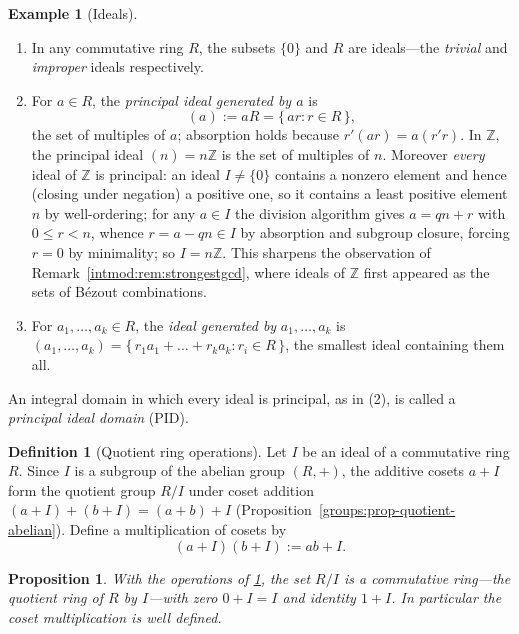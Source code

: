 \documentclass[11pt,a4paper]{article}
\newtheorem{proposition}[theorem]{Proposition}
\theoremstyle{definition}
\newtheorem{definition}[theorem]{Definition}
\newtheorem{example}[theorem]{Example}
\theoremstyle{remark}
\newcommand{\Z}{\ensuremath{\mathbb{Z}}}
\begin{document}
\begin{example}[Ideals]\label{ringsfields:exa-ideal}
\begin{enumerate}
\item In any commutative ring \(R\), the subsets \(\{0\}\) and \(R\) are
  ideals---the \emph{trivial} and \emph{improper} ideals respectively.
\item For \(a\in R\), the \emph{principal ideal generated by \(a\)} is
  \[
  (a):=aR=\{\,ar:r\in R\,\},
  \]
  the set of multiples of \(a\); absorption holds because
  \(r'(ar)=a(r'r)\). In \(\Z\), the principal ideal \((n)=n\Z\) is the set
  of multiples of \(n\). Moreover \emph{every} ideal of \(\Z\) is principal:
  an ideal \(I\neq\{0\}\) contains a nonzero element and hence (closing
  under negation) a positive one, so it contains a least positive element
  \(n\) by well-ordering; for any \(a\in I\) the division algorithm gives
  \(a=qn+r\) with \(0\le r<n\), whence \(r=a-qn\in I\) by absorption and
  subgroup closure, forcing \(r=0\) by minimality; so \(I=n\Z\). This
  sharpens the observation of Remark~\ref{intmod:rem:strongestgcd}, where
  ideals of \(\Z\) first appeared as the sets of B\'ezout combinations.
\item For \(a_1,\dots,a_k\in R\), the \emph{ideal generated by}
  \(a_1,\dots,a_k\) is
  \((a_1,\dots,a_k)=\{\,r_1a_1+\dots+r_ka_k:r_i\in R\,\}\), the smallest
  ideal containing them all.
\end{enumerate}
An integral domain in which every ideal is principal, as in (2), is called
a \emph{principal ideal domain} (PID).
\end{example}

\begin{definition}[Quotient ring operations]\label{ringsfields:def-quotient}
Let \(I\) be an ideal of a commutative ring \(R\). Since \(I\) is a
subgroup of the abelian group \((R,+)\), the additive cosets \(a+I\) form
the quotient group \(R/I\) under coset addition
\((a+I)+(b+I)=(a+b)+I\) (Proposition~\ref{groups:prop-quotient-abelian}).
Define a multiplication of cosets by
\[
(a+I)(b+I):=ab+I.
\]
\end{definition}

\begin{proposition}\label{ringsfields:prop-quotient-well-defined}
With the operations of \cref{ringsfields:def-quotient}, the set \(R/I\) is
a commutative ring---the \emph{quotient ring} of \(R\) by \(I\)---with zero
\(0+I=I\) and identity \(1+I\). In particular the coset multiplication is
well defined.
\end{proposition}
\end{document}
